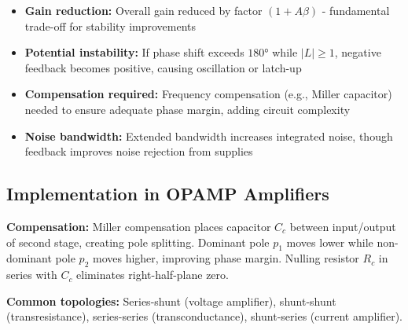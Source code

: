 \documentclass[main.tex]{subfiles}
\begin{document}
\begin{itemize}
    \item \textbf{Gain reduction:} Overall gain reduced by factor $(1+A\beta)$ - fundamental trade-off for stability improvements
    \item \textbf{Potential instability:} If phase shift exceeds $180°$ while $|L| \geq 1$, negative feedback becomes positive, causing oscillation or latch-up
    \item \textbf{Compensation required:} Frequency compensation (e.g., Miller capacitor) needed to ensure adequate phase margin, adding circuit complexity
    \item \textbf{Noise bandwidth:} Extended bandwidth increases integrated noise, though feedback improves noise rejection from supplies
\end{itemize}

\subsection*{Implementation in OPAMP Amplifiers}

\textbf{Compensation:} Miller compensation places capacitor $C_c$ between input/output of second stage, creating pole splitting. Dominant pole $p_1$ moves lower while non-dominant pole $p_2$ moves higher, improving phase margin. Nulling resistor $R_c$ in series with $C_c$ eliminates right-half-plane zero.

\textbf{Common topologies:} Series-shunt (voltage amplifier), shunt-shunt (transresistance), series-series (transconductance), shunt-series (current amplifier).
\end{document}
